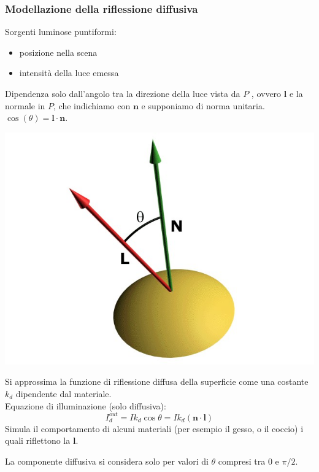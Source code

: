 \documentclass[a4paper, 10pt]{article}
\renewcommand{\vec}{\bm}
\begin{document}
		\subsubsection{Modellazione della riflessione diffusiva}
			Sorgenti luminose puntiformi:
			\begin{itemize}
				\item posizione nella scena
				\item intensità della luce emessa
			\end{itemize}
			
			
			Dipendenza solo dall’angolo tra la direzione della luce vista da $ P $ ,
			ovvero $ \vec{l} $ e la normale in $ P $, che indichiamo con $ \vec{n} $ e supponiamo
			di norma unitaria. $ \cos(\theta) = \vec{l} \cdot \vec{n} $.
			
			\begin{multicols}{2}
				\includegraphics[scale=0.3]{diff}
				
				\columnbreak
				
				\noindent
				Si approssima la funzione di riflessione diffusa della
				superficie come una costante $ k_d $ dipendente dal materiale.\\
				Equazione di illuminazione (solo diffusiva):
				\[
					I_d^{out} = Ik_d\cos\theta = Ik_d(\vec{n}\cdot\vec{l})
				\]
				Simula il comportamento di alcuni materiali (per esempio il
				gesso, o il coccio) i quali riflettono la $ \vec{l} $.
			\end{multicols}
			La componente diffusiva si considera solo per valori di $ \theta $ compresi tra $ 0 $ e $ \pi/2 $.
			
\end{document}

